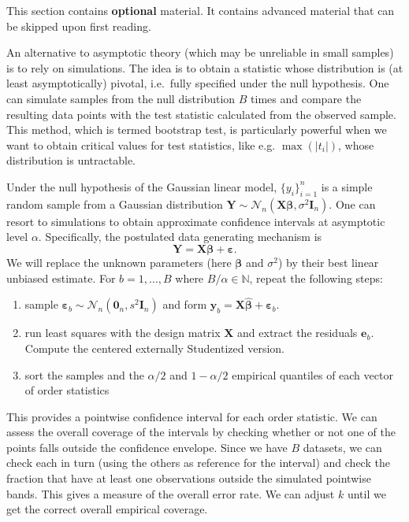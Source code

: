 \documentclass[]{book}
\theoremstyle{definition}
\theoremstyle{definition}
\theoremstyle{definition}
\theoremstyle{remark}
\begin{document}
This section contains \textbf{optional} material. It contains advanced
material that can be skipped upon first reading.

An alternative to asymptotic theory (which may be unreliable in small
samples) is to rely on simulations. The idea is to obtain a statistic
whose distribution is (at least asymptotically) pivotal, i.e.~fully
specified under the null hypothesis. One can simulate samples from the
null distribution \(B\) times and compare the resulting data points with
the test statistic calculated from the observed sample. This method,
which is termed bootstrap test, is particularly powerful when we want to
obtain critical values for test statistics, like e.g. \(\max(|t_i|)\),
whose distribution is untractable.

Under the null hypothesis of the Gaussian linear model,
\(\{y_i\}_{i=1}^n\) is a simple random sample from a Gaussian
distribution
\(\boldsymbol{Y} \sim \mathcal{N}_n(\mathbf{X}\boldsymbol{\beta}, \sigma^2 \mathbf{I}_n)\).
One can resort to simulations to obtain approximate confidence intervals
at asymptotic level \(\alpha\). Specifically, the postulated data
generating mechanism is
\[\boldsymbol{Y} = \mathbf{X}\boldsymbol{\beta} + \boldsymbol{\varepsilon}.\]
We will replace the unknown parameters (here \(\boldsymbol{\beta}\) and
\(\sigma^2\)) by their best linear unbiased estimate. For
\(b=1, \ldots, B\) where \(B/\alpha \in \mathbb{N}\), repeat the
following steps:

\begin{enumerate}
\item sample $\boldsymbol{\varepsilon}_{b} \sim \mathcal{N}_n(\boldsymbol{0}_n, s^2\mathbf{I}_n)$ and form $\boldsymbol{y}_b = \mathbf{X} \hat{\boldsymbol{\beta}} + \boldsymbol{\varepsilon}_{b}$. 
\item run least squares with the design matrix $\mathbf{X}$ and extract the residuals $\boldsymbol{e}_b$. Compute 
the centered externally Studentized version.
\item sort the samples and the $\alpha/2$ and $1-\alpha/2$ empirical quantiles of each vector of order statistics
\end{enumerate}

This provides a pointwise confidence interval for each order statistic.
We can assess the overall coverage of the intervals by checking whether
or not one of the points falls outside the confidence envelope. Since we
have \(B\) datasets, we can check each in turn (using the others as
reference for the interval) and check the fraction that have at least
one observations outside the simulated pointwise bands. This gives a
measure of the overall error rate. We can adjust \(k\) until we get the
correct overall empirical coverage.
\end{document}
